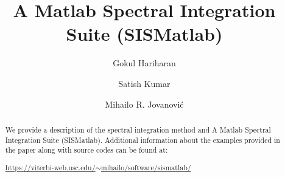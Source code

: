 \documentclass[%
secnumarabic,%
 amssymb, amsmath,%
 aps,prf,superscriptaddress,longbibliography
frontmatterverbose,
]{revtex4-2}
\begin{document}
\title{\bf \large A Matlab Spectral Integration Suite (SISMatlab)}


\author{Gokul Hariharan}
\author{Satish Kumar}
\author{Mihailo R. Jovanovi\'c}



\newcommand{\D}{\mathrm D}
\newcommand{\I}{\mathbf I}
\newcommand{\J}{\mathbf J}
\newcommand{\K}{\mathbf K}
\newcommand{\E}{\mathbf E}
\newcommand{\0}{\mathbf 0}
\newcommand{\T}{\mathbf T}
\newcommand{\R}{\mathbf R}
\newcommand{\DD}[2]{\frac{\partial^2 #1}{\partial #2^2}}
\newcommand{\BB}[1]{\boldsymbol #1}
\newcommand{\hh}[1]{\mathbf{\bar{\text{$#1$}}}}
\newcommand{\HH}[1]{\mathbf{#1}}
\newcommand{\MM}[1]{\mathcal{#1}}
\newcommand{\MMbf}[1]{\mathbfcal{#1}}
\pagebreak

\begin{abstract}
We provide a description of the spectral integration method and A Matlab Spectral Integration Suite ({\sf SISMatlab}). Additional information about the examples provided in the paper along with source codes can be found at: 
	\vspace*{0.15cm}
	\begin{center}
  \href{https://viterbi-web.usc.edu/~mihailo/software/sismatlab/}{https://viterbi-web.usc.edu/$\sim$mihailo/software/sismatlab/}
	\end{center}
	\end{abstract}
\end{document}
